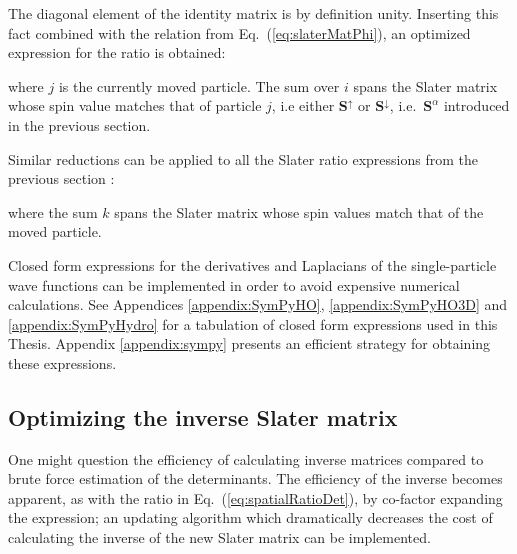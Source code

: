 The diagonal element of the identity matrix is by definition unity. Inserting this fact combined with the relation from Eq.~(\ref{eq:slaterMatPhi}), an optimized expression for the ratio is obtained:


where $j$ is the currently moved particle. The sum over $i$ spans the Slater matrix whose spin value matches that of particle $j$, i.e either $\mathbf{S}^\uparrow$ or $\mathbf{S}^{\downarrow}$, i.e.~$\mathbf{S}^\alpha$ introduced in the previous section.

Similar reductions can be applied to all the Slater ratio expressions from the previous section \cite{abInitioMC, morten}:


where the sum $k$ spans the Slater matrix whose spin values match that of the moved particle.

Closed form expressions for the derivatives and Laplacians of the single-particle wave functions can be implemented in order to avoid expensive numerical calculations. See Appendices \ref{appendix:SymPyHO}, \ref{appendix:SymPyHO3D} and \ref{appendix:SymPyHydro} for a tabulation of closed form expressions used in this Thesis. Appendix \ref{appendix:sympy} presents an efficient strategy for obtaining these expressions.

\subsection{Optimizing the inverse Slater matrix}
\label{sec:optInv}

One might question the efficiency of calculating inverse matrices compared to brute force estimation of the determinants. The efficiency of the inverse becomes apparent, as with the ratio in Eq.~(\ref{eq:spatialRatioDet}), by co-factor expanding the expression; an updating algorithm which dramatically decreases the cost of calculating the inverse of the new Slater matrix can be implemented.

